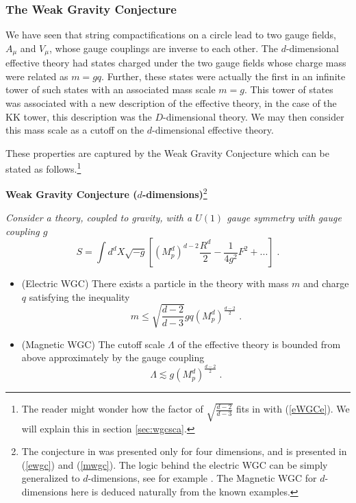 \documentclass[11pt,a4paper]{article}
\numberwithin{equation}{section}
\numberwithin{table}{section}\setlength{\multlinegap}{25pt}
\newcommand{\be}{\begin{equation}}
\newcommand{\ee}{\end{equation}}
\begin{document}
\subsubsection{The Weak Gravity Conjecture}
\label{sec:fewgc}

We have seen that string compactifications on a circle lead to two gauge fields, $A_{\mu}$ and $V_{\mu}$, whose gauge couplings are inverse to each other. The $d$-dimensional effective theory had states charged under the two gauge fields whose charge mass were related as $m = g q$. Further, these states were actually the first in an infinite tower of such states with an associated mass scale $m=g$. This tower of states was associated with a new description of the effective theory, in the case of the KK tower, this description was the $D$-dimensional theory. We may then consider this mass scale as a cutoff on the $d$-dimensional effective theory. 

These properties are captured by the Weak Gravity Conjecture which can be stated as follows.\footnote{The reader might wonder how the factor of $\sqrt{\frac{d-2}{d-3}}$ fits in with (\ref{eWGCe}). We will explain this in section \ref{sec:wgcsca}.}

\begin{tcolorbox}
{\bf Weak Gravity Conjecture ($d$-dimensions)}\footnote{The conjecture in \cite{ArkaniHamed:2006dz} was presented only for four dimensions, and is presented in (\ref{ewgc}) and (\ref{mwgc}). The logic behind the electric WGC can be simply generalized to $d$-dimensions, see for example \cite{Heidenreich:2015nta}. The Magnetic WGC for $d$-dimensions here is deduced naturally from the known examples.} \;\cite{ArkaniHamed:2006dz}
{\it 
\newline
\newline
Consider a theory, coupled to gravity, with a $U(1)$ gauge symmetry with gauge coupling $g$
\be
S = \int d^dX \sqrt{-g} \left[ \left(M_p^d\right)^{d-2} \frac{R^d}{2} - \frac{1}{4g^2} F^2 + ... \right] \;.
\ee
\begin{itemize}
\item (Electric WGC) There exists a particle in the theory with mass $m$ and charge $q$ satisfying the inequality
\be
\label{ewgcd}
m \leq \sqrt{\frac{d-2}{d-3}} g q \left(M_p^d\right)^{\frac{d-2}{2}} \;.
\ee
\item (Magnetic WGC) The cutoff scale $\Lambda$ of the effective theory is bounded from above approximately by the gauge coupling
\be
\label{mwgcd}
\Lambda \lesssim g \left(M_p^d\right)^{\frac{d-2}{2}}  \;.
\ee
\end{itemize}
}
\end{tcolorbox}
\end{document}
